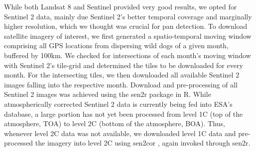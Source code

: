 \documentclass[abstract=off,10pt,a4paper,bibliography=totocnumbered]{article}
\begin{document}
While both Landsat 8 and Sentinel provided very good results, we opted for
Sentinel 2 data, mainly due Sentinel 2's better temporal coverage and marginally
higher resolution, which we thought was crucial for pan detection. To download
satellite imagery of interest, we first generated a spatio-temporal moving
window comprising all GPS locations from dispersing wild dogs of a given month,
buffered by 100km. We checked for intersections of each month's moving window
with Sentinel 2's tile-grid and determined the tiles to be downloaded for every
month. For the intersecting tiles, we then downloaded all available Sentinel 2
images falling into the respective month. Download and pre-processing of all
Sentinel 2 images was achieved using the \textsf{sen2r} package in R. While
atmospherically corrected Sentinel 2 data is currently being fed into ESA's
database, a large portion has not yet been processed from level 1C (top of the
atmosphere, TOA) to level 2C (bottom of the atmosphere, BOA). Thus, whenever
level 2C data was not available, we downloaded level 1C data and pre-processed
the imagery into level 2C using sen2cor \citep{MainKnorn.2017}, again invoked
through \textsf{sen2r}.

\newpage
\begingroup
\singlespacing

\endgroup
\end{document}
